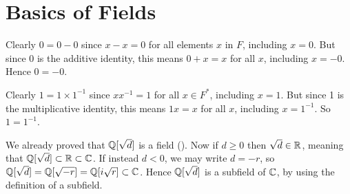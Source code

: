 \section{Basics of Fields}
\begin{questions}
    \item \begin{partquestions}{\alph*}
        \item Clearly $0 = 0 - 0$ since $x - x = 0$ for all elements $x$ in $F$, including $x = 0$. But since 0 is the additive identity, this means $0 + x = x$ for all $x$, including $x = -0$. Hence $0 = -0$.
        \item Clearly $1 = 1\times 1^{-1}$ since $xx^{-1} = 1$ for all $x \in F^\ast$, including $x = 1$. But since 1 is the multiplicative identity, this means $1x = x$ for all $x$, including $x = 1^{-1}$. So $1 = 1^{-1}$.
    \end{partquestions}

    \item We already proved that $\mathbb{Q}[\sqrt{d}]$ is a field (). Now if $d \geq 0$ then $\sqrt{d} \in \mathbb{R}$, meaning that $\mathbb{Q}[\sqrt{d}] \subset \mathbb{R} \subset \mathbb{C}$. If instead $d < 0$, we may write $d = -r$, so $\mathbb{Q}[\sqrt{d}] = \mathbb{Q}[\sqrt{-r}] = \mathbb{Q}[i\sqrt{r}] \subset \mathbb{C}$. Hence $\mathbb{Q}[\sqrt{d}]$ is a subfield of $\mathbb{C}$, by using the definition of a subfield.
\end{questions}
